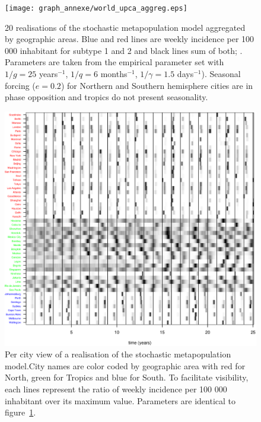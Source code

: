 \documentclass[12pt]{article}
\begin{document}
\begin{figure}[htb]
  \center
  \texttt{[image: graph\_annexe/world\_upca\_aggreg.eps]}
  \caption{20 realisations of the stochastic metapopulation model
    aggregated by geographic areas. Blue and red lines are weekly
    incidence per 100 000 inhabitant for subtype 1 and 2 and black
    lines sum of both; . Parameters are taken from the empirical
    parameter set with $1/g=25$ years$^{-1}$, $1/q=6$ months$^{-1}$,
    $1/ \gamma=1.5$ days$^{-1}$). Seasonal forcing ($e=0.2$) for
    Northern and Southern hemisphere cities are in phase opposition
    and tropics do not present seasonality. }
  \label{fig:world_aggreg}
\end{figure}

\begin{figure}[htb]
  \center
  \includegraphics[width= 0.8 \linewidth]{graph_annexe/image_upca.eps}
  \caption{Per city view of a realisation of the stochastic
    metapopulation model.City names are color coded by geographic area
    with red for North, green for Tropics and blue for South. To
    facilitate visibility, each lines represent the ratio of weekly
    incidence per 100 000 inhabitant over its maximum value.
    Parameters are identical to figure~\ref{fig:world_aggreg}.}
  \label{fig:image_upca}
\end{figure}
\end{document}
